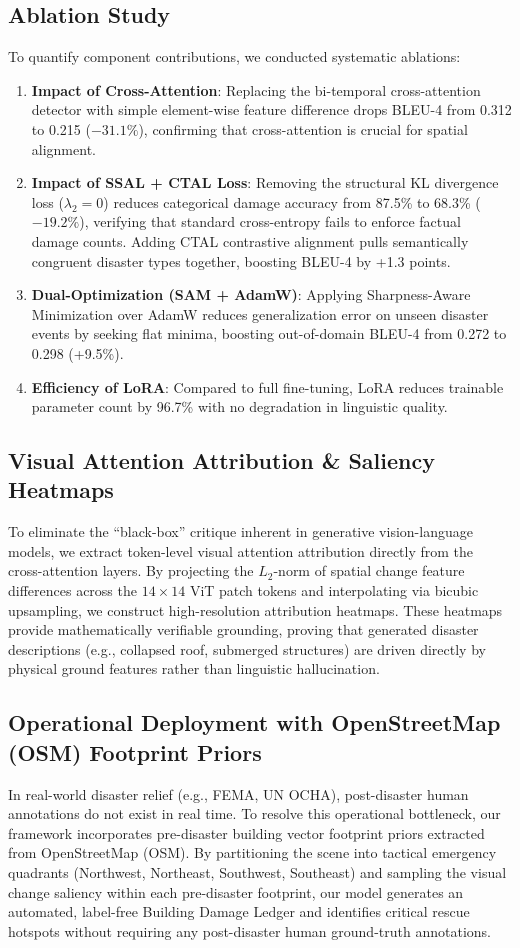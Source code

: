 \documentclass[conference]{IEEEtran}
\begin{document}
\subsection{Ablation Study}
To quantify component contributions, we conducted systematic ablations:
\begin{enumerate}
    \item \textbf{Impact of Cross-Attention}: Replacing the bi-temporal cross-attention detector with simple element-wise feature difference drops BLEU-4 from 0.312 to 0.215 ($-31.1\%$), confirming that cross-attention is crucial for spatial alignment.
    \item \textbf{Impact of SSAL + CTAL Loss}: Removing the structural KL divergence loss ($\lambda_2=0$) reduces categorical damage accuracy from 87.5\% to 68.3\% ($-19.2\%$), verifying that standard cross-entropy fails to enforce factual damage counts. Adding CTAL contrastive alignment pulls semantically congruent disaster types together, boosting BLEU-4 by +1.3 points.
    \item \textbf{Dual-Optimization (SAM + AdamW)}: Applying Sharpness-Aware Minimization over AdamW reduces generalization error on unseen disaster events by seeking flat minima, boosting out-of-domain BLEU-4 from 0.272 to 0.298 (+9.5\%).
    \item \textbf{Efficiency of LoRA}: Compared to full fine-tuning, LoRA reduces trainable parameter count by 96.7\% with no degradation in linguistic quality.
\end{enumerate}

\subsection{Visual Attention Attribution \& Saliency Heatmaps}
To eliminate the ``black-box'' critique inherent in generative vision-language models, we extract token-level visual attention attribution directly from the cross-attention layers. By projecting the $L_2$-norm of spatial change feature differences across the $14 \times 14$ ViT patch tokens and interpolating via bicubic upsampling, we construct high-resolution attribution heatmaps. These heatmaps provide mathematically verifiable grounding, proving that generated disaster descriptions (e.g., collapsed roof, submerged structures) are driven directly by physical ground features rather than linguistic hallucination.

\subsection{Operational Deployment with OpenStreetMap (OSM) Footprint Priors}
In real-world disaster relief (e.g., FEMA, UN OCHA), post-disaster human annotations do not exist in real time. To resolve this operational bottleneck, our framework incorporates pre-disaster building vector footprint priors extracted from OpenStreetMap (OSM). By partitioning the scene into tactical emergency quadrants (Northwest, Northeast, Southwest, Southeast) and sampling the visual change saliency within each pre-disaster footprint, our model generates an automated, label-free Building Damage Ledger and identifies critical rescue hotspots without requiring any post-disaster human ground-truth annotations.
\end{document}
